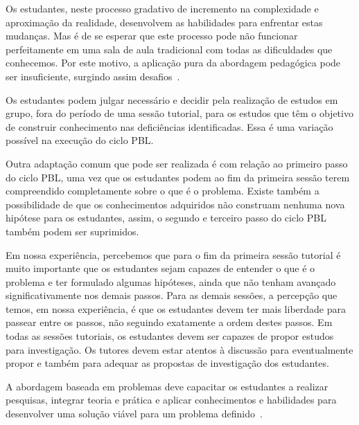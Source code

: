 Os estudantes, neste processo gradativo de incremento
na complexidade e aproximação da realidade, desenvolvem
as habilidades para enfrentar estas mudanças.
Mas é de se esperar que este processo pode não
funcionar perfeitamente em uma sala de aula
tradicional com todas as dificuldades que conhecemos.
Por este motivo, a aplicação pura da abordagem pedagógica
pode ser insuficiente, surgindo assim
desafios~\cite{fee2010teaching}.


Os estudantes podem julgar necessário e decidir
pela realização de estudos em grupo,
fora do período de uma sessão tutorial, para
os estudos que têm o objetivo de construir
conhecimento nas deficiências identificadas.
Essa é uma variação possível na execução
do ciclo \ac{PBL}.

Outra adaptação comum que pode ser realizada
é com relação ao primeiro passo do ciclo \ac{PBL},
uma vez que os estudantes podem ao fim
da primeira sessão terem compreendido
completamente sobre o que é o problema.
Existe também a possibilidade de que os
conhecimentos adquiridos não construam nenhuma
nova hipótese para os estudantes, assim, o segundo
e terceiro passo do ciclo \ac{PBL} também podem ser
suprimidos.

Em nossa experiência, percebemos que para o
fim da primeira sessão tutorial é muito importante
que os estudantes sejam capazes de entender
o que é o problema e ter formulado algumas
hipóteses, ainda que não tenham avançado
significativamente nos demais passos.
Para as demais sessões, a percepção
que temos, em nossa experiência, é
que os estudantes devem ter mais
liberdade para passear entre os passos,
não seguindo exatamente a ordem destes passos.
Em todas as sessões tutoriais, os estudantes
devem ser capazes de propor estudos
para investigação.
Os tutores devem
estar atentos à discussão para
eventualmente propor e também para
adequar as propostas de investigação
dos estudantes.

A abordagem baseada em problemas deve capacitar os estudantes a
realizar pesquisas, integrar teoria e prática e aplicar conhecimentos
e habilidades para desenvolver uma solução viável para
um problema definido~\cite{savery2015overview}.



